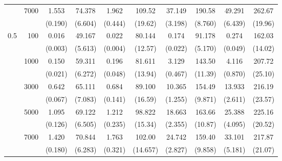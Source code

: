 \begin{table}[t!]
\begin{tabular}{crcccccccc}
		\cline{3-10}
		& 7000   & 1.553 & 74.378  & 1.962 & 109.52 & 37.149 & 190.58 &  49.291 & 262.67 \\ 
		&          & (0.190) & (6.604) & (0.444) & (19.62) & (3.198) & (8.760) & (6.439) & (19.96)\\
		\cline{2-10}
		\multirow{10}{*}{0.5}
		& 100   & 0.016 & 49.167 &  0.022 & 80.144 & 0.174 & 91.178 &  0.274 & 162.03 \\
		&          & (0.003) & (5.613) & (0.004) & (12.57) & (0.022) & (5.170) & (0.049) & (14.02)\\
		\cline{3-10}
		& 1000   & 0.150 & 59.311 &  0.196 & 81.611  & 3.129 & 143.50  & 4.116 & 207.72\\ 
		&          & (0.021) & (6.272) & (0.048) & (13.94) & (0.467) & (11.39) & (0.870) & (25.10)\\
		\cline{3-10}
		& 3000   & 0.642 & 65.111 &  0.684 & 89.100 & 10.365 & 154.49 & 13.933  & 216.19 \\ 
		&          & (0.067) & (7.083) & (0.141) & (16.59) & (1.255) & (9.871) & (2.611) & (23.57)\\ 
		\cline{3-10}
		& 5000   & 1.095 & 69.122  & 1.212 & 98.822 & 18.663 & 163.66 & 25.388 & 225.16 \\ 
		&          & (0.126) & (6.505) & (0.235) & (15.34) & (2.355) & (10.87) & (4.095) & (20.52)\\
		\cline{3-10}
		& 7000   & 1.420  & 70.844 & 1.763 & 102.00 & 24.742 & 159.40 &  33.101 & 217.87 \\ 
		&          & (0.180) & (6.283) & (0.321) & (14.657) & (2.827) & (9.858) & (5.181) & (21.07)\\ 
		\hline\hline
	\end{tabular}
\end{table}



